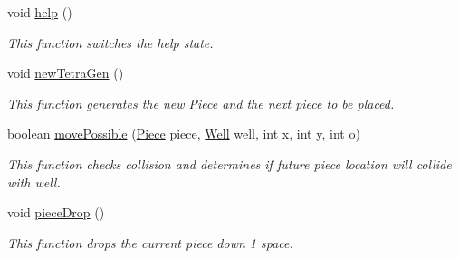 \begin{DoxyCompactItemize}
\hypertarget{class_project_tetris_1_1_group11_1_1_controller_1_1_tetris_controller_afaa1a6dbdbcf65b0333ebd2d8c421caa}{}\label{class_project_tetris_1_1_group11_1_1_controller_1_1_tetris_controller_afaa1a6dbdbcf65b0333ebd2d8c421caa} 
void \hyperlink{class_project_tetris_1_1_group11_1_1_controller_1_1_tetris_controller_afaa1a6dbdbcf65b0333ebd2d8c421caa}{help} ()
\begin{DoxyCompactList}\small\item\em This function switches the help state. \end{DoxyCompactList}\item 
\hypertarget{class_project_tetris_1_1_group11_1_1_controller_1_1_tetris_controller_a17f89bae4791e3eded4de8e4fa356772}{}\label{class_project_tetris_1_1_group11_1_1_controller_1_1_tetris_controller_a17f89bae4791e3eded4de8e4fa356772} 
void \hyperlink{class_project_tetris_1_1_group11_1_1_controller_1_1_tetris_controller_a17f89bae4791e3eded4de8e4fa356772}{new\+Tetra\+Gen} ()
\begin{DoxyCompactList}\small\item\em This function generates the new Piece and the next piece to be placed. \end{DoxyCompactList}\item 
boolean \hyperlink{class_project_tetris_1_1_group11_1_1_controller_1_1_tetris_controller_afabce707cf2676db630a3219e818162b}{move\+Possible} (\hyperlink{class_project_tetris_1_1_group11_1_1_model_1_1_piece}{Piece} piece, \hyperlink{class_project_tetris_1_1_group11_1_1_model_1_1_well}{Well} well, int x, int y, int o)
\begin{DoxyCompactList}\small\item\em This function checks collision and determines if future piece location will collide with well. \end{DoxyCompactList}\item 
\hypertarget{class_project_tetris_1_1_group11_1_1_controller_1_1_tetris_controller_a53fd55396019d540acc1d3f6cffd3478}{}\label{class_project_tetris_1_1_group11_1_1_controller_1_1_tetris_controller_a53fd55396019d540acc1d3f6cffd3478} 
void \hyperlink{class_project_tetris_1_1_group11_1_1_controller_1_1_tetris_controller_a53fd55396019d540acc1d3f6cffd3478}{piece\+Drop} ()
\begin{DoxyCompactList}\small\item\em This function drops the current piece down 1 space. \end{DoxyCompactList}\item 
\hypertarget{class_project_tetris_1_1_group11_1_1_controller_1_1_tetris_controller_a3d7ce2d5ac30aef5c409a04dc934d6e0}{}\label{class_project_tetris_1_1_group11_1_1_controller_1_1_tetris_controller_a3d7ce2d5ac30aef5c409a04dc934d6e0} 

\end{DoxyCompactItemize}
